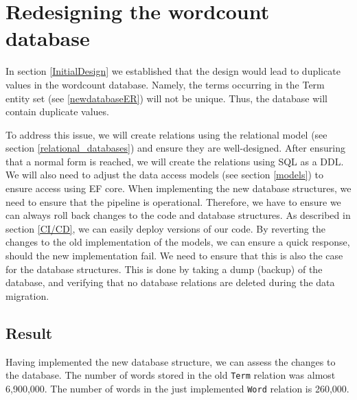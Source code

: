 \section{Redesigning the wordcount database}
In section \ref{InitialDesign} we established that the design would lead to duplicate values in the wordcount database.
Namely, the terms occurring in the Term entity set (see \ref{newdatabaseER}) will not be unique. 
Thus, the database will contain duplicate values.
 
To address this issue, we will create relations using the relational model (see section \ref{relational_databases}) and ensure they are well-designed.
After ensuring that a normal form is reached, we will create the relations using SQL as a DDL.
We will also need to adjust the data access models (see section \ref{models}) to ensure access using EF core.
When implementing the new database structures, we need to ensure that the pipeline is operational. 
Therefore, we have to ensure we can always roll back changes to the code and database structures.
As described in section \ref{CI/CD}, we can easily deploy versions of our code. By reverting the changes to the old implementation of the models, we can ensure a quick response, should the new implementation fail.
We need to ensure that this is also the case for the database structures.
This is done by taking a dump (backup) of the database, and verifying that no database relations are deleted during the data migration.




\subsection{Result}
Having implemented the new database structure, we can assess the changes to the database. 
The number of words stored in the old \texttt{Term} relation was almost 6,900,000.
The number of words in the just implemented \texttt{Word} relation is 260,000.


